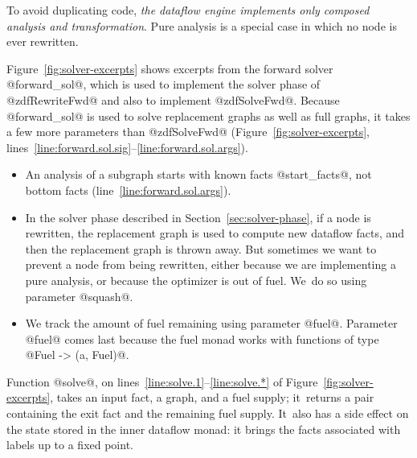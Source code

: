 \documentclass[blockstyle,preprint,natbib,nocopyrightspace]{sigplanconf}
\newcommand\lineref[1]{line~\ref{line:#1}}
\newcommand\linerangeref[2]{\mbox{lines~\ref{line:#1}--\ref{line:#2}}}
\newcommand{\authornote}[1]{{\em #1}}
\def\authornote#1{\unskip\relax}
\newcommand{\simon}[1]{\authornote{SLPJ: #1}}
\newcommand{\norman}[1]{\authornote{NR: #1}}
\let\remark\norman
\def\finalremark#1{\relax}
\newcommand\secref[1]{Section~\ref{sec:#1}}
\newcommand\figref[1]{Figure~\ref{fig:#1}}
\begin{document}
\simon{What does the reader gain from here on?}

To avoid duplicating code,
\emph{the dataflow engine implements only composed
analysis and transformation}.
Pure analysis is a special case in which no node is
ever rewritten.


\finalremark{How and where do we say what's new over
\citet{ramsey-dias:applicative-flow-graph}?}


\figref{solver-excerpts} shows excerpts from the forward solver 
@forward_sol@, which is used to implement the solver phase of
@zdfRewriteFwd@ and also to implement
@zdfSolveFwd@.
Because @forward_sol@ is used to solve replacement graphs as well as
full graphs, it
takes a few more parameters than @zdfSolveFwd@
(\figref{solver-excerpts}, \linerangeref{forward.sol.sig}{forward.sol.args}).
\begin{itemize}
\item
An analysis of a subgraph starts with known facts @start_facts@, not
bottom facts (\lineref{forward.sol.args}).
\item
In the solver phase described in \secref{solver-phase},
if a node is rewritten, the replacement graph is used to compute new
dataflow facts, and then the replacement graph is thrown away.
But sometimes we want to prevent a node from being rewritten,
either because
we are implementing a pure analysis, or because the optimizer
is out of fuel. 
We~do so using parameter @squash@.
\item
We track the amount of fuel remaining using
parameter @fuel@.
Parameter @fuel@ comes last because the fuel monad works with
functions of type @Fuel -> (a, Fuel)@.
\end{itemize}
%
Function @solve@, on \linerangeref{solve.1}{solve.*} of
\figref{solver-excerpts}, 
takes an input fact, a graph, and a fuel supply; it~returns a pair
containing the exit fact and the 
remaining fuel supply.
It~also has a side effect on the state stored in the inner dataflow monad:
it brings the facts associated with labels up to a fixed point.
 
\end{document}
